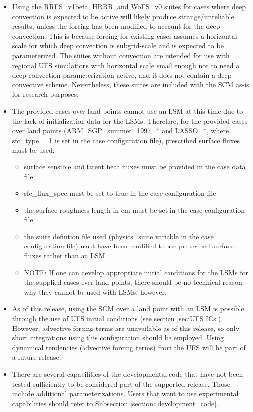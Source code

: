 \begin{itemize}
\item Using the RRFS\_v1beta, HRRR, and WoFS\_v0 suites for cases where deep convection is expected to be active will likely produce strange/unreliable results, unless the forcing has been modified to account for the deep convection. This is because forcing for existing cases assumes a horizontal scale for which deep convection is subgrid-scale and is expected to be parameterized. The  suites without convection are intended for use with regional UFS simulations with horizontal scale small enough not to need a deep convection parameterization active, and it does not contain a deep convective scheme. Nevertheless, these suites are included with the SCM as-is for research purposes.
\item The provided cases over land points cannot use an LSM at this time due to the lack of initialization data for the LSMs. Therefore, for the provided cases over land points (ARM\_SGP\_summer\_1997\_* and LASSO\_*, where sfc\_type = 1 is set in the case configuration file), prescribed surface fluxes must be used:
\begin{itemize}
\item surface sensible and latent heat fluxes must be provided in the case data file
\item sfc\_flux\_spec must be set to true in the case configuration file
\item the surface roughness length in cm must be set in the case configuration file
\item the suite defintion file used (physics\_suite variable in the case configuration file) must have been modified to use prescribed surface fluxes rather than an LSM.
\item NOTE: If one can develop appropriate initial conditions for the LSMs for the supplied cases over land points, there should be no technical reason why they cannot be used with LSMs, however.
\end{itemize}
\item As of this release, using the SCM over a land point with an LSM is possible through the use of UFS initial conditions (see section \ref{sec:UFS ICs}). However, advective forcing terms are unavailable as of this release, so only short integrations using this configuration should be employed. Using dynamical tendencies (advective forcing terms) from the UFS will be part of a future release.
\item There are several capabilities of the developmental code that have not been tested sufficiently to be considered part of the supported release. Those include additional parameterizations. Users that want to use experimental capabilities should refer to Subsection \ref{section: development_code}.
\end{itemize}
